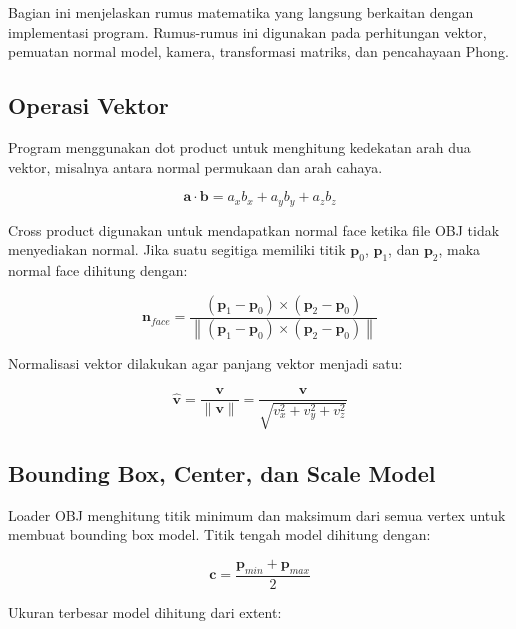 \documentclass[12pt,a4paper]{article}
\begin{document}
Bagian ini menjelaskan rumus matematika yang langsung berkaitan dengan
implementasi program. Rumus-rumus ini digunakan pada perhitungan vektor,
pemuatan normal model, kamera, transformasi matriks, dan pencahayaan Phong.

\subsection{Operasi Vektor}

Program menggunakan dot product untuk menghitung kedekatan arah dua vektor,
misalnya antara normal permukaan dan arah cahaya.

\begin{equation}
    \mathbf{a} \cdot \mathbf{b}
    =
    a_x b_x + a_y b_y + a_z b_z
\end{equation}

Cross product digunakan untuk mendapatkan normal face ketika file OBJ tidak
menyediakan normal. Jika suatu segitiga memiliki titik
$\mathbf{p}_0$, $\mathbf{p}_1$, dan $\mathbf{p}_2$, maka normal face dihitung
dengan:

\begin{equation}
    \mathbf{n}_{face}
    =
    \frac{(\mathbf{p}_1 - \mathbf{p}_0) \times
    (\mathbf{p}_2 - \mathbf{p}_0)}
    {\left\|(\mathbf{p}_1 - \mathbf{p}_0) \times
    (\mathbf{p}_2 - \mathbf{p}_0)\right\|}
\end{equation}

Normalisasi vektor dilakukan agar panjang vektor menjadi satu:

\begin{equation}
    \hat{\mathbf{v}}
    =
    \frac{\mathbf{v}}{\|\mathbf{v}\|}
    =
    \frac{\mathbf{v}}{\sqrt{v_x^2 + v_y^2 + v_z^2}}
\end{equation}

\subsection{Bounding Box, Center, dan Scale Model}

Loader OBJ menghitung titik minimum dan maksimum dari semua vertex untuk
membuat bounding box model. Titik tengah model dihitung dengan:

\begin{equation}
    \mathbf{c}
    =
    \frac{\mathbf{p}_{min} + \mathbf{p}_{max}}{2}
\end{equation}

Ukuran terbesar model dihitung dari extent:
\end{document}
